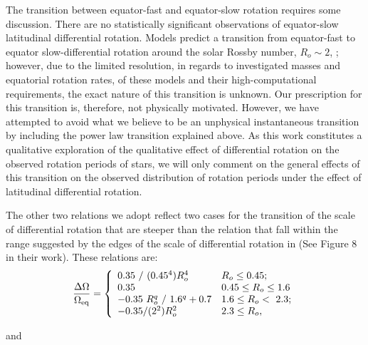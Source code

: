 The transition between equator-fast and equator-slow rotation requires some discussion.
There are no statistically significant observations of equator-slow latitudinal differential rotation.
Models predict a transition from equator-fast to equator slow-differential rotation around the solar Rossby number, $R_o \sim 2$, \citep{brun_powering_2022}; however, due to the limited resolution, in regards to investigated masses and equatorial rotation rates, of these models and their high-computational requirements, the exact nature of this transition is unknown.
Our prescription for this transition is, therefore, not physically motivated.
However, we have attempted to avoid what we believe to be an unphysical instantaneous transition by including the power law transition explained above.
As this work constitutes a qualitative exploration of the qualitative effect of differential rotation on the observed rotation periods of stars, we will only comment on the general effects of this transition on the observed distribution of rotation periods under the effect of latitudinal differential rotation.

The other two relations we adopt reflect two cases for the transition of the scale of differential rotation that are steeper than the \citet{saar_starspots_2011} relation that fall within the range suggested by the edges of the scale of differential rotation in \citet{brun_powering_2022} (See Figure 8 in their work).
These relations are:
\begin{equation}
\label{eq:rot_pow4}
{\centering
\frac{\Delta\Omega}{\Omega_{\rm{eq}}} = \left\{
\begin{array}{ll}
 0.35 \ / \ (0.45^4) R_o^4& R_o\leq 0.45; \\
 0.35 & 0.45\leq R_o\leq 1.6 \\
 -0.35 \ R_o^q \ / \ 1.6^q + 0.7 & 1.6 \leq R_o < \ 2.3;\\
 -0.35/(2^2) R_o^2& 2.3\leq R_o, \\
\end{array} 
\right.}
\end{equation}

and

